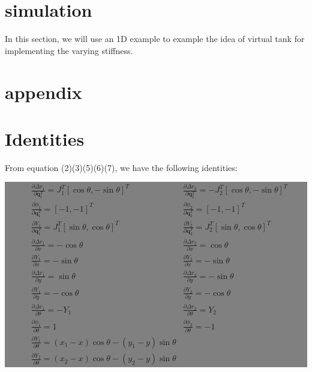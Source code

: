 \documentclass[]{article}
\begin{document}
\section{simulation}
In this section, we will use an 1D example to example the idea of virtual tank for implementing the varying stiffness.

\section{appendix}
\appendix
\section{Identities}
\label{sec::app1}
From equation (2)(3)(5)(6)(7), we have the following identities:

\colorbox{gray}{
\begin{minipage}{9cm}
 \begin{align*}
 &\frac{\partial \Delta r_1}{\partial \mathbf{q}_1^T}=J_{1}^T\left[\cos\theta,-\sin\theta\right]^T 
 &\frac{\partial \Delta r_2}{\partial \mathbf{q}_2^T}=-J_{2}^T\left[\cos\theta,-\sin\theta\right]^T\nonumber\\
 &\frac{\partial \phi_1}{\partial \mathbf{q}_1^T}=[-1,-1]^T
 &\frac{\partial \phi_2}{\partial \mathbf{q}_2^T}=[-1,-1]^T\nonumber\\
 &\frac{\partial Y_1}{\partial\mathbf{q}_1^T}=J_1^T[\sin\theta,\cos\theta]^T
 &\frac{\partial Y_2}{\partial \mathbf{q}_2^T}=J_2^T[\sin\theta,\cos\theta]^T\nonumber\\
 &\frac{\partial \Delta r_1}{\partial x}=-\cos\theta
 &\frac{\partial \Delta r_2}{\partial x}=\cos\theta \nonumber\\
 &\frac{\partial Y_1}{\partial x}=-\sin\theta 
 &\frac{\partial Y_2}{\partial x}=-\sin\theta \nonumber\\
 &\frac{\partial \Delta r_1}{\partial y}=\sin\theta&\frac{\partial \Delta r_2}{\partial y}=-\sin\theta \nonumber\\
  &\frac{\partial Y_1}{\partial y}=-\cos\theta &\frac{\partial Y_2}{\partial y}=-\cos\theta \nonumber\\
  &\frac{\partial \Delta r_1}{\partial \theta}=-Y_1&\frac{\partial \Delta r_2}{\partial \theta}=Y_2\nonumber\\
  &\frac{\partial \phi_1}{\partial \theta}=1&\frac{\partial \phi_2}{\partial \theta}=-1\nonumber\\
  &\frac{\partial Y_1}{\partial \theta}=(x_1-x)\cos\theta-(y_1-y)\sin\theta&\\
  &\frac{\partial Y_2}{\partial \theta}=(x_2-x)\cos\theta-(y_2-y)\sin\theta&\nonumber
 \end{align*}
\end{minipage}}
\end{document}
